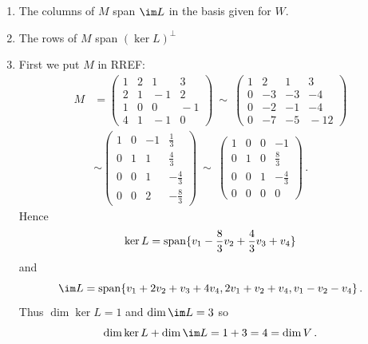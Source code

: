 \begin{enumerate}
\begin{enumerate}
\item The columns of $M$ span $\im L$ in the basis given for $W$.
\item The rows of $M$ span $(\ker L)^\perp$%
\item First we put $M$ in RREF:
\begin{align*}
M& = \begin{pmatrix}1&2&1&3\\2&1&\!-1&2\\1&0&0&\!-1\\4&1&\!-1&0\end{pmatrix}
\ \sim\
\begin{pmatrix}1&2&1&3\\0&-3&-3&-4\\0&-2&-1&-4\\0&-7&-5&\!-12\end{pmatrix}\\[2mm]
&\sim 
\begin{pmatrix}1&0&-1&\frac13\\[1mm]0&1&1&\frac43\\[1mm]0&0&1&-\frac43\\[1mm]0&0&2&-\frac83\end{pmatrix}
\ \sim\ \begin{pmatrix}1&0&0&-1\\[1mm]0&1&0&\frac83\\[1mm]0&0&1&-\frac43\\[1mm]0&0&0&0\end{pmatrix}\, .
\end{align*}
Hence \[\ker L=\operatorname{span}\{v_1-\frac83v_2+\frac43 v_3+v_4\}\] and \[\im L=\spa\{v_1+2v_2+v_3+4v_4,2v_1+v_2+v_4,v_1-v_2-v_4\}\, .\]
Thus $\dim\ker L=1$ and $\dim\im L=3$ so \[\dim\ker L+\dim\im L=1+3=4=\dim V\, .\]
\end{enumerate}


\end{enumerate}
